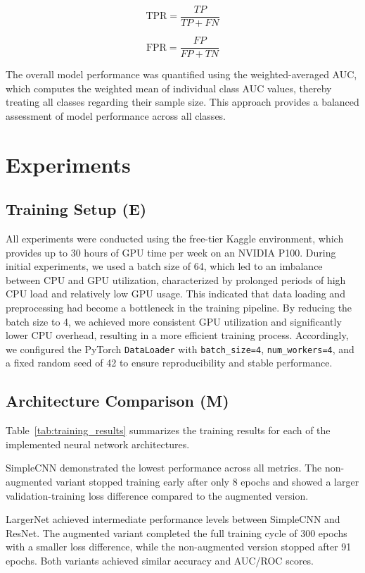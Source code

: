 \documentclass[a4paper]{article}
\begin{document}
\begin{equation}
\text{TPR} = \frac{TP}{TP + FN}
\end{equation}

\begin{equation}
\text{FPR} = \frac{FP}{FP + TN}
\end{equation}

The overall model performance was quantified using the weighted-averaged AUC, which computes the weighted mean of individual class AUC values, thereby treating all classes regarding their sample size. This approach provides a balanced assessment of model performance across all classes.

\section{Experiments}
\subsection{Training Setup (E)}
All experiments were conducted using the free-tier Kaggle environment, which provides up to 30 hours of GPU time per week on an NVIDIA P100. During initial experiments, we used a batch size of 64, which led to an imbalance between CPU and GPU utilization, characterized by prolonged periods of high CPU load and relatively low GPU usage. This indicated that data loading and preprocessing had become a bottleneck in the training pipeline. By reducing the batch size to 4, we achieved more consistent GPU utilization and significantly lower CPU overhead, resulting in a more efficient training process. Accordingly, we configured the PyTorch \verb|DataLoader| with \verb|batch_size=4|, \verb|num_workers=4|, and a fixed random seed of 42 to ensure reproducibility and stable performance.

\subsection{Architecture Comparison (M)}
Table~\ref{tab:training_results} summarizes the training results for each of the implemented neural network architectures.

SimpleCNN demonstrated the lowest performance across all metrics. The non-augmented variant stopped training early after only 8 epochs and showed a larger validation-training loss difference compared to the augmented version.

LargerNet achieved intermediate performance levels between SimpleCNN and ResNet. The augmented variant completed the full training cycle of 300 epochs with a smaller loss difference, while the non-augmented version stopped after 91 epochs. Both variants achieved similar accuracy and AUC/ROC scores.
\end{document}
